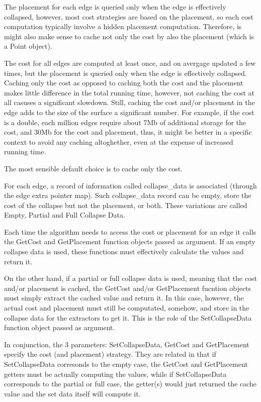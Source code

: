 The placement for each edge is queried only when the edge is effectively collapsed, however, most cost strategies are based on the placement, so each cost computation typically involve a hidden placement computation. Therefore, is might also make sense to cache not only the cost by also the placement (which is a Point object).

The cost for all edges are computed at least once, and on avergage updated a few times, but the placement is queried only when the edge is effectively collapsed. Caching only the cost as opposed to caching both the cost and the placement makes little difference in the total running time, however, not caching the cost at all casuses a significant slowdown. Still, caching the cost and/or placement in the edge adds to the size of the surface a significant number. For example, if the cost is a double, each million edges require about 7Mb of additional storage for the cost, and 30Mb for the cost and placement, thus, it might be better in a specific context to avoid any caching altoghether, even at the expense of increased running time.

The most sensible default choice is to cache only the cost.

For each edge, a record of information called collapse\_data is associated (through the edge extra pointer map). Such collapse\_data record can be empty, store the cost of the collapse but not the placement, or both. These variations are called Empty, Partial and Full Collapse Data.

Each time the algorithm needs to access the cost or placement for an edge it calls the GetCost and GetPlacement function objects passed as argument. If an empty collapse data is used, these functions must effectively calculate the values and return it.

On the other hand, if a partial or full collapse data is used, meaning that the cost and/or placement is cached, the GetCost and/or GetPlacement fucntion objects must simply extract the cached value and return it. In this case, however, the actual cost and placement must still be computated, somehow, and store in the collapse data for the extractors to get it. This is the role of the SetCollapseData function object passed as argument.

In conjunction, the 3 parameters: SetCollapseData, GetCost and GetPlacement specify the cost (and placement) strategy. They are related in that if SetCollapseData corresonds to the empty case, the GetCost and GetPlacement getters must be actually computing the values, while if SetCollapseData corresponds to the partial or full case, the getter(s) would just returned the cache value and the set data itself will compute it.

